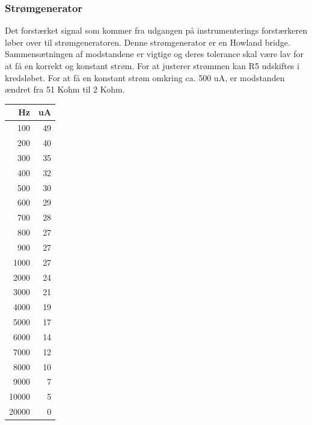 \documentclass[main.tex]{subfiles}
\begin{document}
\subsubsection{Strømgenerator}
Det forstærket signal som kommer fra udgangen på instrumenterings forstærkeren løber over til strømgeneratoren. Denne strømgenerator er en Howland bridge. Sammensætningen af modstandene er vigtige og deres tolerance skal være lav for at få en korrekt og konstant strøm. For at justerer strømmen kan R5 udskiftes i kredsløbet. For at få en konstant strøm omkring ca. 500 uA, er modstanden ændret fra 51 Kohm til 2 Kohm.  

\begin{center}
  \begin{tabular}{ r |  r }
    \hline
    Hz & uA \\ \hline
    100 & 49 \\ \hline
    200 & 40 \\ \hline
    300 & 35 \\ \hline
    400 & 32 \\ \hline
    500 & 30 \\ \hline
    600 & 29 \\ \hline
    700 & 28 \\ \hline
    800 & 27 \\ \hline
    900 & 27 \\ \hline
    1000 & 27 \\ \hline
    2000 & 24 \\ \hline
    3000 & 21 \\ \hline
    4000 & 19 \\ \hline
    5000 & 17 \\ \hline
    6000 & 14 \\ \hline
    7000 & 12 \\ \hline
    8000 & 10 \\ \hline
    9000 & 7 \\ \hline
    10000 & 5 \\ \hline
    20000 & 0 \\ \hline
    
    
  \end{tabular}
\end{center}
\end{document}
